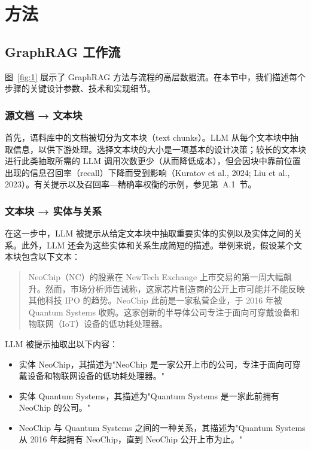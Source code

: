 \documentclass[11pt,UTF8,fontset=fandol]{ctexart}
\begin{document}
\section{方法}

\subsection{GraphRAG 工作流}

图~\ref{fig:1} 展示了 GraphRAG 方法与流程的高层数据流。在本节中，我们描述每个步骤的关键设计参数、技术和实现细节。

\subsubsection{源文档 → 文本块}

首先，语料库中的文档被切分为文本块（text chunks）。LLM 从每个文本块中抽取信息，以供下游处理。选择文本块的大小是一项基本的设计决策；较长的文本块进行此类抽取所需的 LLM 调用次数更少（从而降低成本），但会因块中靠前位置出现的信息召回率（recall）下降而受到影响（Kuratov et al., 2024; Liu et al., 2023）。有关提示以及召回率—精确率权衡的示例，参见第~A.1~节。

\subsubsection{文本块 → 实体与关系}

在这一步中，LLM 被提示从给定文本块中抽取重要实体的实例以及实体之间的关系。此外，LLM 还会为这些实体和关系生成简短的描述。举例来说，假设某个文本块包含以下文本：

\begin{quote}
NeoChip（NC）的股票在 NewTech Exchange 上市交易的第一周大幅飙升。然而，市场分析师告诫称，这家芯片制造商的公开上市可能并不能反映其他科技 IPO 的趋势。NeoChip 此前是一家私营企业，于 2016 年被 Quantum Systems 收购。这家创新的半导体公司专注于面向可穿戴设备和物联网（IoT）设备的低功耗处理器。
\end{quote}

LLM 被提示抽取出以下内容：

\begin{itemize}[leftmargin=2em]
\item 实体 NeoChip，其描述为"NeoChip 是一家公开上市的公司，专注于面向可穿戴设备和物联网设备的低功耗处理器。"
\item 实体 Quantum Systems，其描述为"Quantum Systems 是一家此前拥有 NeoChip 的公司。"
\item NeoChip 与 Quantum Systems 之间的一种关系，其描述为"Quantum Systems 从 2016 年起拥有 NeoChip，直到 NeoChip 公开上市为止。"
\end{itemize}
\end{document}
